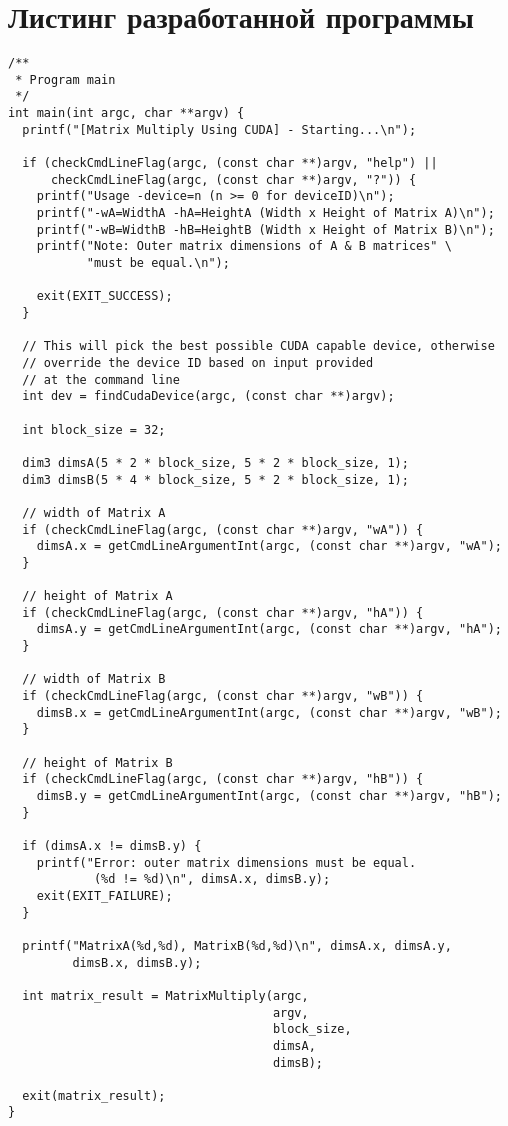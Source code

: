 \chapter{Листинг разработанной программы}

\begin{lstlisting}[caption={Пример листинга в приложении}, label={ls:a:01}]
/**
 * Program main
 */
int main(int argc, char **argv) {
  printf("[Matrix Multiply Using CUDA] - Starting...\n");

  if (checkCmdLineFlag(argc, (const char **)argv, "help") ||
      checkCmdLineFlag(argc, (const char **)argv, "?")) {
    printf("Usage -device=n (n >= 0 for deviceID)\n");
    printf("-wA=WidthA -hA=HeightA (Width x Height of Matrix A)\n");
    printf("-wB=WidthB -hB=HeightB (Width x Height of Matrix B)\n");
    printf("Note: Outer matrix dimensions of A & B matrices" \
           "must be equal.\n");

    exit(EXIT_SUCCESS);
  }

  // This will pick the best possible CUDA capable device, otherwise
  // override the device ID based on input provided 
  // at the command line
  int dev = findCudaDevice(argc, (const char **)argv);

  int block_size = 32;

  dim3 dimsA(5 * 2 * block_size, 5 * 2 * block_size, 1);
  dim3 dimsB(5 * 4 * block_size, 5 * 2 * block_size, 1);

  // width of Matrix A
  if (checkCmdLineFlag(argc, (const char **)argv, "wA")) {
    dimsA.x = getCmdLineArgumentInt(argc, (const char **)argv, "wA");
  }

  // height of Matrix A
  if (checkCmdLineFlag(argc, (const char **)argv, "hA")) {
    dimsA.y = getCmdLineArgumentInt(argc, (const char **)argv, "hA");
  }

  // width of Matrix B
  if (checkCmdLineFlag(argc, (const char **)argv, "wB")) {
    dimsB.x = getCmdLineArgumentInt(argc, (const char **)argv, "wB");
  }

  // height of Matrix B
  if (checkCmdLineFlag(argc, (const char **)argv, "hB")) {
    dimsB.y = getCmdLineArgumentInt(argc, (const char **)argv, "hB");
  }

  if (dimsA.x != dimsB.y) {
    printf("Error: outer matrix dimensions must be equal. 
            (%d != %d)\n", dimsA.x, dimsB.y);
    exit(EXIT_FAILURE);
  }

  printf("MatrixA(%d,%d), MatrixB(%d,%d)\n", dimsA.x, dimsA.y,
         dimsB.x, dimsB.y);

  int matrix_result = MatrixMultiply(argc, 
                                     argv, 
                                     block_size, 
                                     dimsA, 
                                     dimsB);

  exit(matrix_result);
}
\end{lstlisting}